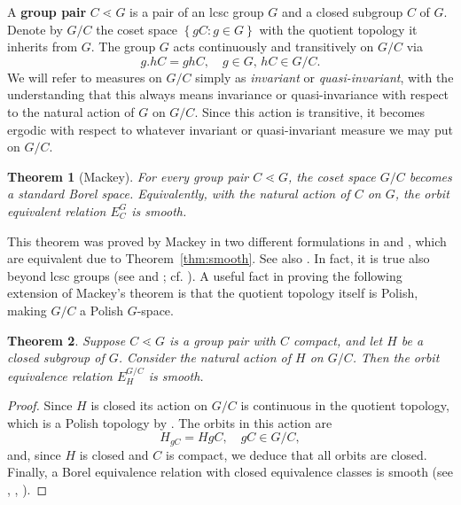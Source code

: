 \documentclass{amsart}
\numberwithin{equation}{subsection}
\newtheorem{thm}{Theorem}[section]
\begin{document}
A {\bf group pair} \(C\lessdot G\) is a pair of an lcsc group \(G\) and a closed subgroup \(C\) of \(G\). Denote by \(G/C\) the coset space \(\left\{gC:g\in G\right\}\) with the quotient topology it inherits from \(G\). The group \(G\) acts continuously and transitively on \(G/C\) via
\[g.hC=ghC,\quad g\in G,\, hC\in G/C.\]
We will refer to measures on \(G/C\) simply as {\it invariant} or {\it quasi-invariant}, with the understanding that this always means invariance or quasi-invariance with respect to the natural action of \(G\) on \(G/C\). Since this action is transitive, it becomes ergodic with respect to whatever invariant or quasi-invariant measure we may put on \(G/C\).

\begin{thm}[Mackey]
For every group pair \(C\lessdot G\), the coset space \(G/C\) becomes a standard Borel space. Equivalently, with the natural action of \(C\) on \(G\), the orbit equivalent relation \(E_{C}^{G}\) is smooth.
\end{thm}

This theorem was proved by Mackey in two different formulations in \cite[Lemma 1.1]{mackey1952induced} and \cite[Theorem 7.2]{mackey1957borel}, which are equivalent due to Theorem~\ref{thm:smooth}. See also \cite[Corollary A.8]{zimmer2013ergodic}. In fact, it is true also beyond lcsc groups (see \cite[Theorem (12.17)]{kechris2012descriptive} and \cite[Theorem 2.2.10]{gao2008invariant}; cf. \cite[Proposition 3.4.6]{gao2008invariant}). A useful fact in proving the following extension of Mackey's theorem is that the quotient topology itself is Polish, making \(G/C\) a Polish \(G\)-space.

\begin{thm}
\label{thm:compstabsmooth}
Suppose \(C\lessdot G\) is a group pair with \(C\) compact, and let \(H\) be a closed subgroup of \(G\). Consider the natural action of \(H\) on \(G/C\). Then the orbit equivalence relation \(E_{H}^{G/C}\) is smooth.
\end{thm}

\begin{proof}
Since \(H\) is closed its action on \(G/C\) is continuous in the quotient topology, which is a Polish topology by \cite[Theorem 2.2.10]{gao2008invariant}. The orbits in this action are
\[H_{gC}=HgC,\quad gC\in G/C,\]
and, since \(H\) is closed and \(C\) is compact, we deduce that all orbits are closed. Finally, a Borel equivalence relation with closed equivalence classes is smooth (see \cite[Theorem (12.16)]{kechris2012descriptive}, \cite[Theorem 6.4.4(iv)]{gao2008invariant}, \cite[Proposition 2.1.12]{zimmer2013ergodic}).
\end{proof}
\end{document}

